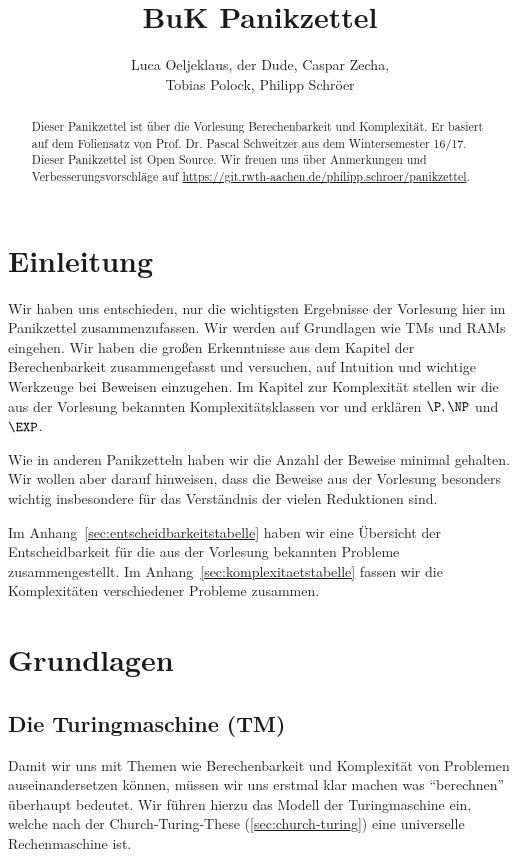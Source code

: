 \documentclass[a4paper,parskip=half*,DIV=7,fontsize=11pt]{scrartcl}
\title{BuK Panikzettel}
\author{Luca Oeljeklaus, der Dude\blfootnote{Pseudonyme geh\"oren anonymen Autoren, die anonym bleiben wollen.}, Caspar Zecha,\\ Tobias Polock, Philipp Schröer}
\begin{document}
\maketitle

\begin{abstract}
Dieser Panikzettel ist über die Vorlesung Berechenbarkeit und Komplexität. Er basiert auf dem Foliensatz von Prof. Dr. Pascal Schweitzer aus dem Wintersemester 16/17.	\\
Dieser Panikzettel ist Open Source. Wir freuen uns über Anmerkungen und Verbesserungsvorschläge auf \url{https://git.rwth-aachen.de/philipp.schroer/panikzettel}.
\end{abstract}

\tableofcontents

\newpage

\section{Einleitung}

Wir haben uns entschieden, nur die wichtigsten Ergebnisse der Vorlesung hier im Panikzettel zusammenzufassen. Wir werden auf Grundlagen wie TMs und RAMs eingehen. Wir haben die großen Erkenntnisse aus dem Kapitel der Berechenbarkeit zusammengefasst und versuchen, auf Intuition und wichtige Werkzeuge bei Beweisen einzugehen. Im Kapitel zur Komplexität stellen wir die aus der Vorlesung bekannten Komplexitätsklassen vor und erklären $\P, \NP$ und $\EXP$. 

Wie in anderen Panikzetteln haben wir die Anzahl der Beweise minimal gehalten. Wir wollen aber darauf hinweisen, dass die Beweise aus der Vorlesung besonders wichtig insbesondere für das Verständnis der vielen Reduktionen sind.

Im Anhang~\ref{sec:entscheidbarkeitstabelle} haben wir eine Übersicht der Entscheidbarkeit für die aus der Vorlesung bekannten Probleme zusammengestellt. Im Anhang~\ref{sec:komplexitaetstabelle} fassen wir die Komplexitäten verschiedener Probleme zusammen.

\section{Grundlagen}
\subsection{Die Turingmaschine (TM)}
Damit wir uns mit Themen wie Berechenbarkeit und Komplexität von Problemen auseinandersetzen können, müssen wir uns erstmal klar machen was  ``berechnen'' überhaupt bedeutet. Wir führen hierzu das Modell der Turingmaschine ein, welche nach der Church-Turing-These (\ref{sec:church-turing}) eine universelle Rechenmaschine ist.
\end{document}
